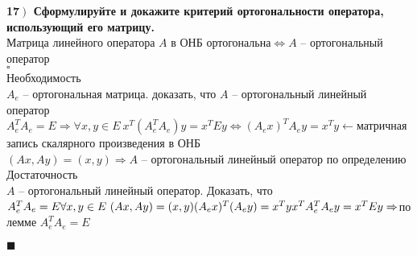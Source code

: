 \documentclass[a4paper,12pt]{article}
\begin{document}
    \textbf{17$\left.\right)$ Сформулируйте и докажите критерий ортогональности оператора, использующий его матрицу.}\\
    Матрица линейного оператора $A$ в ОНБ ортогональна$\Leftrightarrow A$ -- ортогональный оператор\\
    $\square$\\
    Необходимость\\
    $A_e$ -- ортогональная матрица. доказать, что $A$ -- ортогональный линейный оператор\\
    $A_e^TA_e=E\Rightarrow\forall x, y\in E\ x^T(A_e^TA_e)y=x^TEy\Leftrightarrow(A_ex)^TA_ey=x^Ty\leftarrow$матричная запись скалярного произведения в ОНБ\\
    $(Ax, Ay)=(x, y)\Rightarrow A$ -- ортогональный линейный оператор по определению\\
    Достаточность\\
    $A$ -- ортогональный линейный оператор. Доказать, что $A_e^TA_e=E\\
    \forall x, y\in E\ (Ax, Ay)=(x, y)\\
    (A_ex)^T(A_ey)=x^Ty\\
    x^TA_e^TA_ey=x^TEy\Rightarrow$по лемме $A_e^TA_e=E$
    \begin{flushright}
        $\blacksquare$
    \end{flushright}
\end{document}
